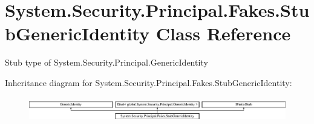 \hypertarget{class_system_1_1_security_1_1_principal_1_1_fakes_1_1_stub_generic_identity}{\section{System.\-Security.\-Principal.\-Fakes.\-Stub\-Generic\-Identity Class Reference}
\label{class_system_1_1_security_1_1_principal_1_1_fakes_1_1_stub_generic_identity}
}


Stub type of System.\-Security.\-Principal.\-Generic\-Identity 


Inheritance diagram for System.\-Security.\-Principal.\-Fakes.\-Stub\-Generic\-Identity\-:\begin{figure}[H]
\begin{center}
\leavevmode
\includegraphics[height=1.085271cm]{class_system_1_1_security_1_1_principal_1_1_fakes_1_1_stub_generic_identity}
\end{center}
\end{figure}

